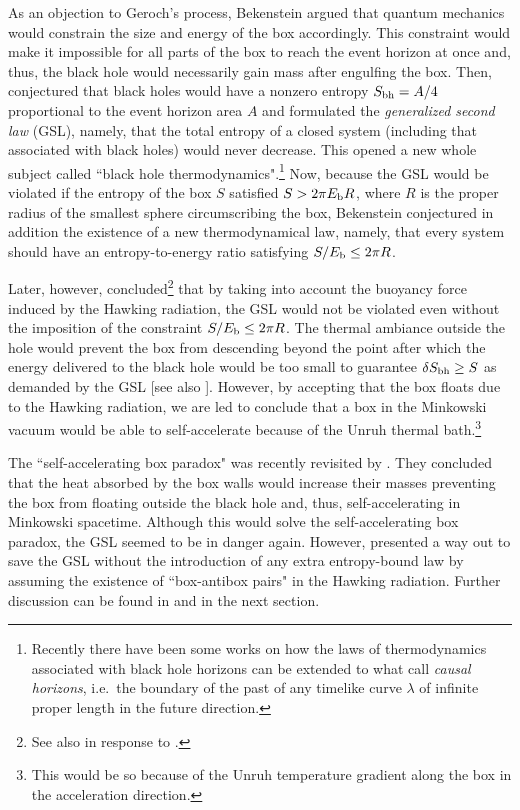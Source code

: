 \documentclass[12pt,nofootinbib,floatfix,aps,prd,showpacs,amsmath,amssymb,eqsecnum]{revtex4-2}
\begin{document}
As an objection to Geroch's process, Bekenstein argued 
that quantum mechanics would constrain the size and 
energy of the box  accordingly. This constraint would make it impossible
for all parts of the box to reach 
the event horizon at once and, thus, the black 
hole would necessarily gain mass after engulfing 
the box. Then, \textcite{Bekenstein73} conjectured 
that black holes would have a nonzero entropy 
$S_{\rm bh} = A /4$ proportional to the 
event horizon area $A$  and formulated the 
{\em generalized second law} (GSL), namely, that the 
total entropy of a closed system (including that
associated with black holes) would never decrease.
This opened a new whole subject called
``black hole
thermodynamics".\footnote{Recently there have been some 
works on how the
laws of thermodynamics associated with black hole horizons can 
be extended to what \textcite{Jacobsonetal03} call {\em causal 
horizons}, i.e.~the boundary of the past 
of any timelike curve $\lambda$ of infinite proper length in 
the future direction.}
Now, because the GSL would be violated if the entropy of the box $S$ 
satisfied $S> 2 \pi E_{\rm b} R$, where 
$R$ is the proper radius of the smallest sphere circumscribing 
the box, Bekenstein conjectured in addition
the existence of a new thermodynamical law, namely, that every system
should have an entropy-to-energy ratio satisfying 
$S/E_{\rm b} \leq 2 \pi R$. 

Later, however, \textcite{UnruhWald82} 
concluded\footnote{See also \textcite{UnruhWald83}
in response to \textcite{Bekenstein83}.} 
that by taking into account the buoyancy force induced by the Hawking
radiation, the GSL would not be violated even without
the imposition of the constraint 
$S/E_{\rm b} \leq 2 \pi R$. The thermal 
ambiance outside the hole would prevent the box from descending 
beyond the point after which the energy delivered to the black 
hole would be too small to guarantee $\delta S_{\rm bh} \geq S$ 
as demanded by the GSL [see also \textcite{Matsasetal05}]. 
However, by accepting that the box floats due to the 
Hawking radiation, we are led to conclude that a box in 
the Minkowski vacuum would be able to self-accelerate   
because of the Unruh thermal bath.\footnote{This 
would be so because of the Unruh temperature gradient along 
the box in the acceleration direction.} 

The ``self-accelerating box paradox" was recently
revisited by \textcite{Marolfetal02}. They concluded that
the heat absorbed by the box walls would increase their  
masses preventing the box from floating outside the black hole 
and, thus, self-accelerating
in Minkowski spacetime. Although this would solve the self-accelerating 
box paradox, the GSL seemed to be in danger again. However,
\textcite{Marolfetal02} presented a way out to save 
the GSL without the introduction of any extra entropy-bound law 
by assuming the existence of ``box-antibox pairs" in the Hawking 
radiation. Further discussion can be found in \textcite{Marolfetal04b}
and in the next section.
\end{document}
